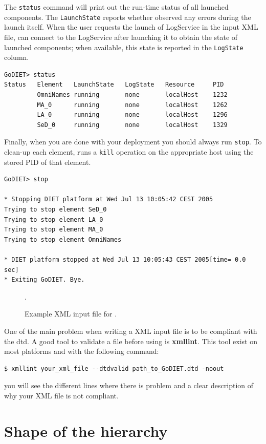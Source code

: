The \texttt{status} command will print out the run-time status of all launched
components. The \texttt{LaunchState} reports whether \godiet observed any
errors during the launch itself. When the user requests the launch of
LogService in the input XML file, \godiet can connect to the LogService  after
launching it to obtain the state of launched components; when available, this
state is reported in the \texttt{LogState} column.

\begin{verbatim}
GoDIET> status
Status   Element   LaunchState   LogState   Resource     PID
         OmniNames running       none       localHost    1232
         MA_0      running       none       localHost    1262
         LA_0      running       none       localHost    1296
         SeD_0     running       none       localHost    1329
\end{verbatim}

Finally, when you are done with your \diet deployment you should always run
\texttt{stop}. To clean-up each element, \godiet runs a \texttt{kill} operation
on the appropriate host using the stored PID of that element.

\begin{verbatim}
GoDIET> stop

* Stopping DIET platform at Wed Jul 13 10:05:42 CEST 2005
Trying to stop element SeD_0
Trying to stop element LA_0
Trying to stop element MA_0
Trying to stop element OmniNames

* DIET platform stopped at Wed Jul 13 10:05:43 CEST 2005[time= 0.0 sec]
* Exiting GoDIET. Bye.
\end{verbatim}

\begin{figure}[p]
.
\caption{Example XML input file for \godiet.\label{fig:godietXml}}
\end{figure}

One of the main problem when writing a \godiet XML input file is to be compliant
with the dtd. A good tool to validate a \godiet file before using \godiet is
\textbf{xmllint}. This tool exist on most platforms and with the following
command:
\begin{verbatim}
$ xmllint your_xml_file --dtdvalid path_to_GoDIET.dtd -noout
\end{verbatim}
you will see the different lines where there is problem and a clear description
of why your XML file is not compliant.

\clearpage

\section{Shape of the hierarchy}

